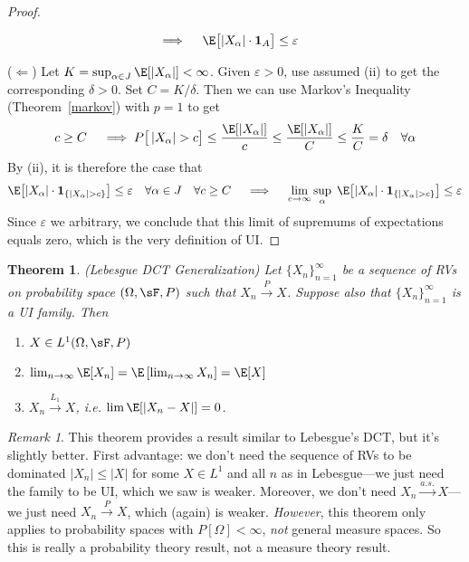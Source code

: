 \documentclass[12pt]{article}
\theoremstyle{plain}
\newtheorem{thm}{Theorem}[section]
\theoremstyle{definition}
\theoremstyle{remark}
\newtheorem*{rmk}{Remark}
\newcommand{\ra}{\rightarrow}
\newcommand{\one}[1]{\mathbf{1}_{#1}}
\newcommand{\asto}{\xrightarrow{a.s.}}
\newcommand{\pto}{\xrightarrow{P}}
\newcommand{\Lqto}[1]{\xrightarrow{L_{#1}}}
\newcommand{\ninf}{_{n=1}^\infty}
\newcommand{\limn}{\lim_{n\rightarrow\infty}}
\begin{document}
\begin{proof}
\begin{enumerate}[label=(\roman*)]
\begin{align*}
      \implies\quad
      \E\big[
        |X_\alpha|\cdot \one{A}
      \big]
      &\leq \varepsilon
    \end{align*}
\end{enumerate}
($\Leftarrow$)
Let $K=\sup_{\alpha \in J}\E[ |X_\alpha|]<\infty$.
Given $\varepsilon>0$, use assumed (ii) to get the corresponding
$\delta>0$.
Set $C = K/\delta$.
Then we can use Markov's Inequality
(Theorem~\ref{markov}) with $p=1$ to get
\begin{align*}
  c\geq C\quad\implies
    P\big[ \left\lvert X_\alpha\right\rvert > c\big]
    \leq \frac{\E[|X_\alpha|]}{c}
    \leq \frac{\E[|X_\alpha|]}{C}
    \leq \frac{K}{C} = \delta
    \quad\forall \alpha
\end{align*}
By (ii), it is therefore the case that
\begin{align*}
  \E\big[
    |X_\alpha|\cdot \one{\{\left\lvert X_\alpha\right\rvert > c\}}
  \big]
  \leq \varepsilon
  \quad \forall \alpha\in J\quad\forall c\geq C
  \quad\implies\quad
  \lim_{c\ra\infty}\sup_\alpha\;
  \E\big[
    |X_\alpha|\cdot \one{\{\left\lvert X_\alpha\right\rvert > c\}}
  \big]
  \leq \varepsilon
\end{align*}
Since $\varepsilon$ we arbitrary, we conclude that this limit of
supremums of expectations equals zero, which is the very definition of
UI.
\end{proof}

\begin{thm}\emph{(Lebesgue DCT Generalization)}
Let $\{X_n\}\ninf$ be a sequence of RVs on probability space
$(\Omega,\sF,P)$ such that $X_n\pto X$. Suppose also that $\{X_n\}\ninf$
is a UI family. Then
\begin{enumerate}[label=\emph{(\roman*)}]
  \item $X\in L^1(\Omega,\sF,P)$
  \item $\limn \E[X_n] = \E\left[\limn X_n\right] = \E[X]$
  \item $X_n \Lqto{1} X$, i.e. $\lim \E[|X_n-X|] = 0$.
\end{enumerate}
\end{thm}
\begin{rmk}
This theorem provides a result similar to Lebesgue's DCT, but it's
slightly better.
First advantage: we don't need the sequence of RVs to be dominated
$|X_n|\leq |X|$ for some $X\in L^1$ and all $n$ as in Lebesgue---we just
need the family to be UI, which we saw is weaker.  Moreover, we don't
need $X_n\asto X$---we just need $X_n\pto X$, which (again) is weaker.
\emph{However}, this theorem only applies to probability spaces with
$P[\Omega]<\infty$, \emph{not} general measure spaces.
So this is really a probability theory result, not a measure theory
result.
\end{rmk}
\end{document}
